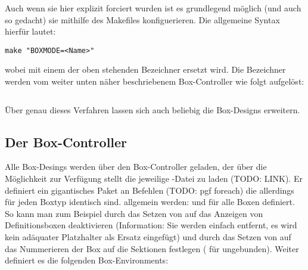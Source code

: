 Auch wenn sie hier explizit forciert wurden ist es grundlegend möglich (und auch so gedacht) sie mithilfe des Makefiles konfiguerieren. Die allgemeine Syntax hierfür lautet:
\begin{lstlisting}[style=bash]
make "BOXMODE=<Name>"
\end{lstlisting}
wobei  mit einem der oben stehenden Bezeichner ersetzt wird. Die Bezeichner werden vom weiter unten näher beschriebenem Box-Controller wie folgt aufgelöst:
\begin{lstlisting}[style=latex,frame=none]

\end{lstlisting}
Über genau dieses Verfahren lassen sich auch beliebig die Box-Designs erweitern.
\subsection{Der Box-Controller}
{\centering {}\vspace*{0.5\baselineskip}\par}\reversemarginpar
Alle Box-Desings werden über den Box-Controller geladen, der über  die Möglichkeit zur Verfügung stellt die jeweilige -Datei zu laden (TODO: LINK). Er definiert ein gigantisches Paket an Befehlen (TODO: pgf foreach) die allerdings für jeden Boxtyp identisch sind. allgemein werden:  und  für alle Boxen definiert. So kann man zum Beispiel durch das Setzen von  auf  das Anzeigen von Definitionsboxen deaktivieren (Information: Sie werden einfach entfernt, es wird kein adäquater Platzhalter als Ersatz eingefügt) und durch das Setzen von  auf das Nummerieren der Box auf die Sektionen festlegen ( für ungebunden).
Weiter definiert es die folgenden Box-Environments:
%

